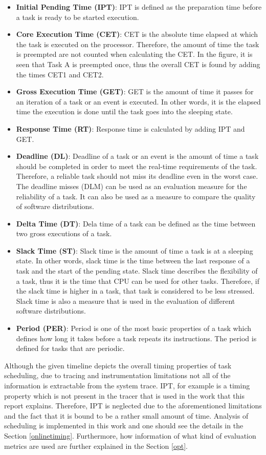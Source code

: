 \begin{itemize}
	\item \textbf{Initial Pending Time (IPT)}: IPT is defined as the preparation time before a task is ready to be started execution.
	\item \textbf{Core Execution Time (CET)}: CET is the absolute time elapsed at which the task is executed on the processor. Therefore, the amount of time the task is preempted are not counted when calculating the CET. In the figure, it is seen that Task A is preempted once, thus the overall CET is found by adding the times CET1 and CET2.
	\item \textbf{Gross Execution Time (GET)}: GET is the amount of time it passes for an iteration of a task or an event is executed. In other words, it is the elapsed time the execution is done until the task goes into the sleeping state.
	\item \textbf{Response Time (RT)}: Response time is calculated by adding IPT and GET. 
	\item \textbf{Deadline (DL)}: Deadline of a task or an event is the amount of time a task should be completed in order to meet the real-time requirements of the task. Therefore, a reliable task should not miss its deadline even in the worst case. The deadline misses (DLM) can be used as an evaluation measure for the reliability of a task. It can also be used as a measure to compare the quality of software distributions.
	\item \textbf{Delta Time (DT)}: Dela time of a task can be defined as the time between two gross executions of a task.
	\item \textbf{Slack Time (ST)}: Slack time is the amount of time a task is at a sleeping state. In other words, slack time is the time between the last response of a task and the start of the pending state. Slack time describes the flexibility of a task, thus it is the time that CPU can be used for other tasks. Therefore, if the slack time is higher in a task, that task is considered to be less stressed. Slack time is also a measure that is used in the evaluation of different software distributions. 
	\item \textbf{Period (PER)}: Period is one of the most basic properties of a task which defines how long it takes before a task repeats its instructions. The period is defined for tasks that are periodic.
\end{itemize}

Although the given timeline depicts the overall timing properties of task scheduling, due to tracing and instrumentation limitations not all of the information is extractable from the system trace. IPT, for example is a timing property which is not present in the tracer that is used in the work that this report explains. Therefore, IPT is neglected due to the aforementioned limitations and the fact that it is bound to be a rather small amount of time. Analysis of scheduling is implemented in this work and one should see the details in the Section \ref{onlinetiming}. Furthermore, how information of what kind of evaluation metrics are used are further explained in the Section \ref{opt}.

